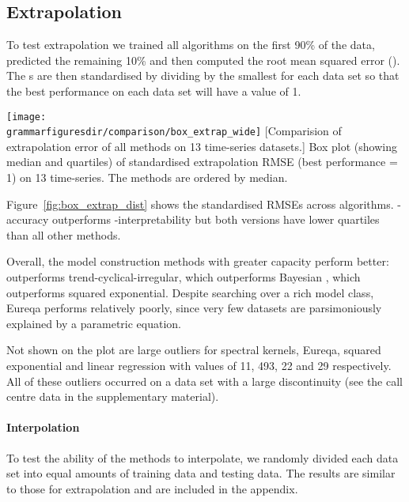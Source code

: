 \subsection{Extrapolation}

To test extrapolation we trained all algorithms on the first 90\% of the data, predicted the remaining 10\% and then computed the root mean squared error (\RMSE{}).
The \RMSE{}s are then standardised by dividing by the smallest \RMSE{} for each data set so that the best performance on each data set will have a value of 1.

\hspace{-6mm}\texttt{[image: \\grammarfiguresdir/comparison/box\_extrap\_wide]}
[Comparision of extrapolation error of all methods on 13 time-series datasets.]
{Box plot (showing median and quartiles) of standardised extrapolation RMSE (best performance = 1) on 13 time-series.
The methods are ordered by median.
}
\label{fig:box_extrap_dist}

Figure~\ref{fig:box_extrap_dist} shows the standardised RMSEs across algorithms.
\procedurename{}-accuracy outperforms \procedurename{}-interpretability but both versions have lower quartiles than all other methods.

Overall, the model construction methods with greater capacity perform better: \procedurename{} outperforms trend-cyclical-irregular, which outperforms Bayesian \MKL{}, which outperforms squared exponential.
Despite searching over a rich model class, Eureqa performs relatively poorly, since very few datasets are parsimoniously explained by a parametric equation.

Not shown on the plot are large outliers for spectral kernels, Eureqa, squared exponential and linear regression with values of 11, 493, 22 and 29 respectively.
All of these outliers occurred on a data set with a large discontinuity (see the call centre data in the supplementary material).

\paragraph{Interpolation}
To test the ability of the methods to interpolate, we randomly divided each data set into equal amounts of training data and testing data.
The results are similar to those for extrapolation and are included in the appendix.




